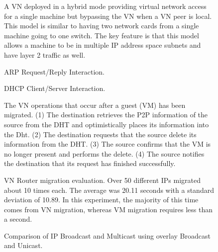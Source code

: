 \begin{figure}[ht]
\centering
{}
\caption[VN Hybrid]{A VN deployed in a hybrid mode providing virtual network
access for a single machine but bypassing the VN when a VN peer is local.  This
model is similar to having two network cards from a single machine going to one
switch.  The key feature is that this model allows a machine to be in multiple
IP address space subnets and have layer 2 traffic as well.}
\label{fig:hybrid}
\end{figure}

\begin{figure}[ht]
\centering
{}
\caption{ARP Request/Reply Interaction.}
\label{fig:arp}
\end{figure}

\begin{figure}[ht]
\centering
{}
\caption{DHCP Client/Server Interaction.}
\label{fig:dhcp}
\end{figure}

\begin{figure}[ht]
\centering
{}
\caption[VN Router Migration]{The VN operations that occur after a guest (VM)
has been migrated.  (1) The destination retrieves the P2P information of the
source from the DHT and optimistically places its information into the Dht.
(2) The destination requests that the source delete its information from the
DHT.  (3)  The source confirms that the VM is no longer present and performs
the delete.  (4)  The source notifies the destination that its request has
finished successfully.}
\label{fig:migration_ring}
\end{figure}

\begin{figure}[ht]
\centering
{}
\caption[VN Router migration evaluation]{VN Router migration evaluation.  Over
50 different IPs migrated about 10 times each.  The average was 20.11 seconds
with a standard deviation of 10.89.  In this experiment, the majority of this
time comes from VN migration, whereas VM migration requires less than a second.}
\label{fig:mig}
\end{figure}

\begin{figure}[ht]
\centering
\caption{Comparison of IP Broadcast and Multicast using overlay Broadcast and
Unicast.}
\label{fig:broadcast}
\end{figure}

